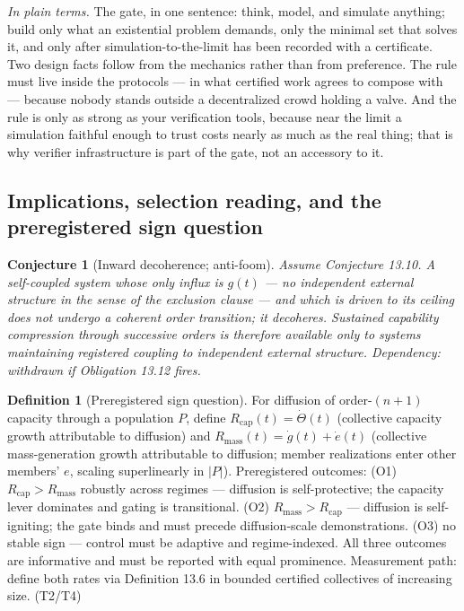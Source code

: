 \documentclass[11pt]{article}
\newtheorem{conjecture}{Conjecture}
\theoremstyle{definition}
\newtheorem{definition}{Definition}
\newcommand{\plainterms}{\emph{In plain terms.}}
\begin{document}
\noindent\plainterms{} The gate, in one sentence: think, model, and simulate anything; build only what an existential problem demands, only the minimal set that solves it, and only after simulation-to-the-limit has been recorded with a certificate. Two design facts follow from the mechanics rather than from preference. The rule must live inside the protocols --- in what certified work agrees to compose with --- because nobody stands outside a decentralized crowd holding a valve. And the rule is only as strong as your verification tools, because near the limit a simulation faithful enough to trust costs nearly as much as the real thing; that is why verifier infrastructure is part of the gate, not an accessory to it.

\subsection{Implications, selection reading, and the preregistered sign question}

\begin{conjecture}[Inward decoherence; anti-foom]
Assume Conjecture 13.10. A self-coupled system whose only influx is $g(t)$ --- no independent external structure in the sense of the exclusion clause --- and which is driven to its ceiling does not undergo a coherent order transition; it decoheres. Sustained capability compression through successive orders is therefore available only to systems maintaining registered coupling to independent external structure. Dependency: withdrawn if Obligation 13.12 fires.
\end{conjecture}

\begin{definition}[Preregistered sign question]
For diffusion of order-$(n+1)$ capacity through a population $P$, define $R_{\mathrm{cap}}(t) = \dot{\Theta}(t)$ (collective capacity growth attributable to diffusion) and $R_{\mathrm{mass}}(t) = \dot{g}(t) + \dot{e}(t)$ (collective mass-generation growth attributable to diffusion; member realizations enter other members' $e$, scaling superlinearly in $|P|$). Preregistered outcomes: (O1) $R_{\mathrm{cap}} > R_{\mathrm{mass}}$ robustly across regimes --- diffusion is self-protective; the capacity lever dominates and gating is transitional. (O2) $R_{\mathrm{mass}} > R_{\mathrm{cap}}$ --- diffusion is self-igniting; the gate binds and must precede diffusion-scale demonstrations. (O3) no stable sign --- control must be adaptive and regime-indexed. All three outcomes are informative and must be reported with equal prominence. Measurement path: define both rates via Definition 13.6 in bounded certified collectives of increasing size. (T2/T4)
\end{definition}
\end{document}

